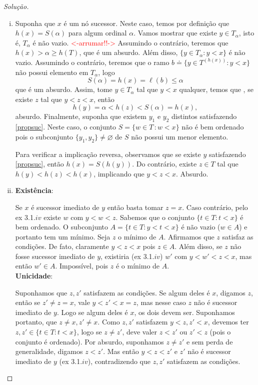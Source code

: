 \documentclass[a4paper]{article}
\theoremstyle{plain}\newtheorem{teo}{Teorema}[section]
\begin{document}
\begin{proof}[Solução]
\begin{enumerate}[(i)]
  \item Suponha que \(x\) é um nó sucessor. Neste caso, temos por definição
    que \(h(x)=S(\alpha)\) para algum ordinal \(\alpha\). Vamos mostrar que
    existe \(y\in T_\alpha\), isto é,
    \(T_\alpha\) é não vazio.
    \textcolor{red}{<-arrumar!!->}
    Assumindo o contrário, teremos que
    \(h(x)>\alpha\geq h(T)\), que é um absurdo. Além disso,
    \(\{ y\in T_\alpha : y<x\}\) é não vazio. Assumindo o contrário, teremos que o ramo $b\doteq\{y\in T^{(h(x))}: y<x\}$ não possui elemento em $T_\alpha$, logo \[S(\alpha)=h(x)=\ell(b)\leq\alpha\] que é um absurdo. 
    Assim, tome $y\in T_\alpha$ tal que $y<x$ qualquer, temos que ,
    se  existe \(z\) tal que \(y<z<x\), então
    \[h(y)=\alpha<h(z)<S(\alpha)=h(x),\] absurdo.
    Finalmente, suponha que
    existem \(y_1\)
    e \(y_2\) distintos satisfazendo \eqref{propsuc}. Neste caso, o conjunto \(S=\{w\in
    T\,\colon w <x\}\) não é bem ordenado pois o subconjunto
    \(\{y_1,y_2\}\not = \varnothing\) de \(S\) não possui um menor elemento.

    Para verificar a implicação reversa, observamos que se existe \(y\) satisfazendo
    \eqref{propsuc}, então \(h(x)=S(h(y))\). Do contrário, existe \(z\in T\) tal
    que \(h(y)<h(z)<h(x)\), implicando que \(y<z<x\). Absurdo.

  \item
    \textbf{Existência}:
    \par
    Se $x$ é sucessor imediato de $y$ então basta tomar $z=x$. Caso contrário, pelo ex 3.1.$iv$ existe $w$ com $y < w < z$.
    Sabemos que o conjunto $\{t \in T : t < x\}$ é bem ordenado. O subconjunto $A = \{ t \in T : y < t < x\}$ é não vazio ($w \in A$) e portanto tem um mínimo. Seja $z$ o mínimo de $A$. Afirmamos que $z$ satisfaz as condições. De fato, claramente $y < z < x$ pois $z \in A$. Além disso, se $z$ não fosse sucessor imediato de $y$, existiria (ex 3.1.$iv$) $w'$ com $y< w'<z<x$, mas então $w' \in A$. Impossível, pois $z$ é o mínimo de $A$.\\
    \textbf{Unicidade}:
    \par
    Suponhamos que $z,z'$ satisfazem as condições. Se algum deles é $x$, digamos $z$, então se $z' \neq z = x$, vale $y < z' < x= z$, mas nesse caso $z$ não é sucessor imediato de $y$. Logo se algum deles é $x$, os dois devem ser. Suponhamos portanto, que $z \neq x, z' \neq x$. Como $z,z'$ satisfazem $y < z, z' < x$, devemos ter $z,z' \in \{t \in T:t <x\}$, logo se $z \neq z'$, deve valer $z < z'$ ou $z' < z$ (pois o conjunto é ordenado). Por absurdo, suponhamos $z \neq z'$ e sem perda de generalidade, digamos $z < z'$. Mas então $y < z < z'$ e $z'$ não é sucessor imediato de $y$ (ex 3.1.$iv$), contradizendo que $z,z'$ satisfazem as condições.


\end{enumerate}
\end{proof}
\end{document}
